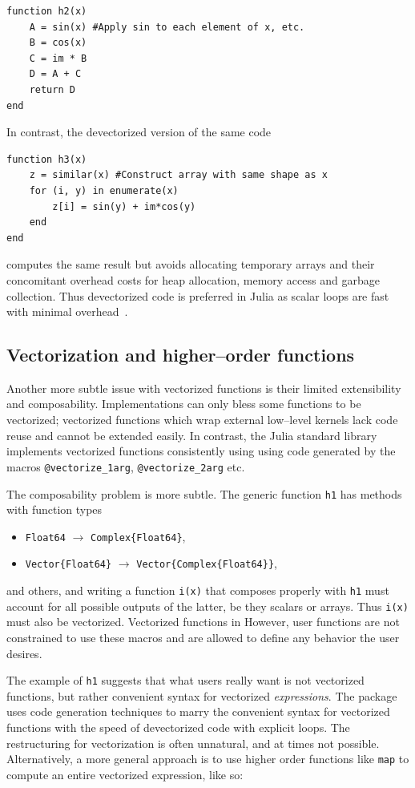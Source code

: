 \documentclass[pldi]{sigplanconf-pldi15}
\begin{document}
\begin{lstlisting}
function h2(x)
    A = sin(x) #Apply sin to each element of x, etc.
    B = cos(x)
    C = im * B
    D = A + C
    return D
end
\end{lstlisting}
%
In contrast, the devectorized version of the same code

\begin{lstlisting}
function h3(x)
    z = similar(x) #Construct array with same shape as x
    for (i, y) in enumerate(x)
        z[i] = sin(y) + im*cos(y)
    end
end
\end{lstlisting}
%
computes the same result but avoids allocating temporary arrays and their
concomitant overhead costs for heap allocation, memory access and garbage
collection. Thus devectorized code is preferred in Julia as scalar loops are
fast with minimal overhead~\cite{Bezanson2014b}. 


\subsection{Vectorization and higher--order functions}

Another more subtle issue with vectorized functions is their limited
extensibility and composability. Implementations can only bless some
functions to be vectorized; vectorized functions which wrap external low--level
kernels lack code reuse and cannot be extended easily. In contrast, the Julia
standard library implements vectorized functions consistently using using code
generated by the macros \verb|@vectorize_1arg|, \verb|@vectorize_2arg| etc.

The composability problem is more subtle. The generic function \verb|h1| has
methods with function types

\begin{itemize}
	\item \verb|Float64| $\rightarrow$ \verb|Complex{Float64}|,
	\item \verb|Vector{Float64}| $\rightarrow$ \verb|Vector{Complex{Float64}}|,
\end{itemize}
%
and others, and writing a function \verb|i(x)| that composes properly with
\verb|h1| must account for all possible outputs of the latter, be they scalars
or arrays. Thus \verb|i(x)| must also be vectorized. Vectorized functions in
However, user functions are not constrained to use these macros and are allowed
to define any behavior the user desires.

The example of \verb|h1| suggests that what users really want is not vectorized
functions, but rather convenient syntax for vectorized \textit{expressions}.
The  package uses code generation techniques to marry
the convenient syntax for vectorized functions with the speed of devectorized
code with explicit loops. The restructuring for vectorization is often
unnatural, and at times not possible. Alternatively, a more general approach is
to use higher order functions like \verb|map| to compute an entire vectorized
expression, like so:
\end{document}

